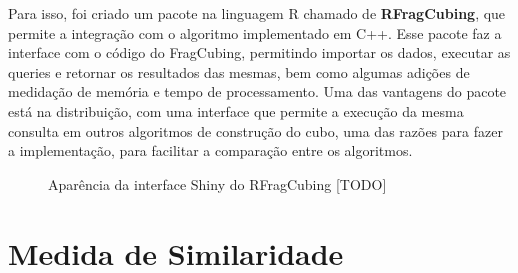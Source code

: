 Para isso, foi criado um pacote na linguagem R chamado de \textbf{RFragCubing}, que permite a integração com o algoritmo implementado em C++.
Esse pacote faz a interface com o código do FragCubing, permitindo importar os dados, executar as queries e retornar os resultados das mesmas, bem como algumas adições de medidação de memória e tempo de processamento.
Uma das vantagens do pacote está na distribuição, com uma interface que permite a execução da mesma consulta em outros algoritmos de construção do cubo, uma das razões para fazer a implementação, para facilitar a comparação entre os algoritmos.

\begin{figure}[ht]
	\caption{\color{red} Aparência da interface Shiny do RFragCubing [TODO]}
	\vspace{6mm}
	\begin{center}
	\end{center}
	\vspace{4mm}
	\legenda{}
	\label{fig:shinyrfrag}
\end{figure}

\section{Medida de Similaridade}
\label{ch:impl:similarity}

